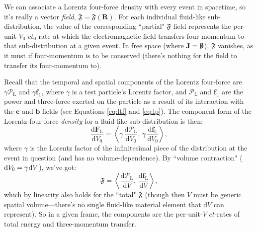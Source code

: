 \documentclass[12pt]{article}
\renewcommand{\vv}[1]{\mathbf{#1}}
\newcommand{\dd}[1]{\mathrm{d}#1}
\begin{document}
We can associate a Lorentz four-force density with every event in spacetime, so it's really a vector \emph{field}, $\bm{\mathfrak{F}} = \bm{\mathfrak{F}} (\vv R)$. For each individual fluid-like sub-distribution, the value of the corresponding ``partial" $\bm{\mathfrak{F}}$ field represents the per-unit-$V_0$ $ct_0$-rate at which the electromagnetic field transfers four-momentum to that sub-distribution at a given event. In free space (where $\vv J = \textrm{\mbox{\boldmath $\emptyset$}}$), $\bm{\mathfrak{F}}$ vanishes, as it must if four-momentum is to be conserved (there's nothing for the field to transfer its four-momentum to).

Recall that the temporal and spatial components of the Lorentz four-force are $\gamma \mathcal{P}_{\mathrm{L}}$ and $\gamma \vv f_{\textrm{L}}$, where $\gamma$ is a test particle's Lorentz factor, and $\mathcal{P}_{\mathrm{L}}$ and $\vv f_{\textrm{L}}$ are the power and three-force exerted on the particle as a result of its interaction with the $\vv e$ and $\vv b$ fields (see Equations \ref{eq:ltf} and \ref{eq:lp}). The component form of the Lorentz four-force \emph{density} for a fluid-like sub-distribution is then:
\begin{equation*}
\dfrac{\dd \vv F_{\mathrm{L}}}{\dd V_0} = \left \langle \gamma \, \dfrac{\dd \mathcal{P}_{\textrm{L}} }{\dd V_0}, \, \gamma \, \dfrac{\dd \vv f_{\textrm{L}}}{\dd V_0} \right \rangle,
\end{equation*}
where $\gamma$ is the Lorentz factor of the infinitesimal piece of the distribution at the event in question (and has no volume-dependence). By ``volume contraction" ($\dd V_0 = \gamma \mkern1mu \dd V$), we've got:
\begin{equation}\label{eq:lffdc}
\bm{\mathfrak{F}} = \left \langle \dfrac{\dd \mathcal{P}_{\mathrm{L}}}{\dd V}, \, \dfrac{\dd \vv f_{\mathrm{L}}}{\dd V} \right \rangle ,
\end{equation}
which by linearity also holds for the ``total" $\bm{\mathfrak{F}}$ (though then $V$ must be generic spatial volume---there's no single fluid-like material element that $\dd V$ can represent). So in a given frame, the components are the per-unit-$V$ $ct$-rates of total energy and three-momentum transfer.
\end{document}
